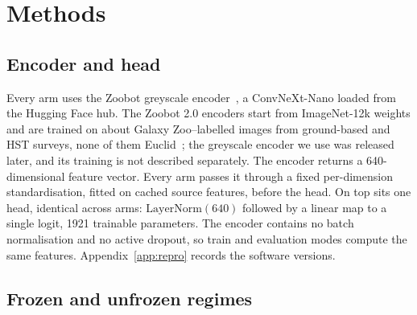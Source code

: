 \section{Methods}
\label{sec:methods}

\subsection{Encoder and head}

Every arm uses the Zoobot greyscale encoder~\citep{zoobot}, a ConvNeXt-Nano loaded from the
Hugging Face hub. The Zoobot 2.0 encoders start from ImageNet-12k weights and are trained on
about \zoobotPretrainImages{} Galaxy Zoo--labelled images from ground-based and HST surveys,
none of them Euclid~\citep{walmsley2024scaling}; the greyscale encoder we use was released
later, and its training is not described separately. The encoder returns a 640-dimensional feature
vector. Every arm passes it through a fixed per-dimension standardisation, fitted on cached
source features, before the head. On top sits one head, identical across arms: $\mathrm{LayerNorm}(640)$ followed by a
linear map to a single logit, 1921 trainable parameters. The encoder contains no batch
normalisation and no active dropout, so train and evaluation modes compute the same features.
Appendix~\ref{app:repro} records the software versions.

\subsection{Frozen and unfrozen regimes}

